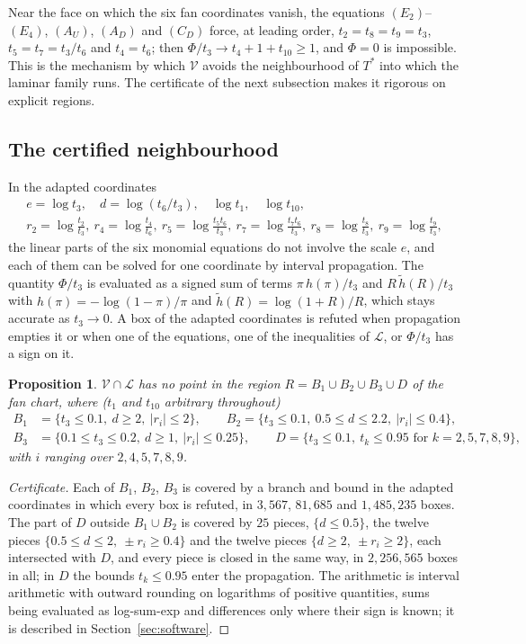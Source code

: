 \documentclass[11pt,a4paper]{article}
\newtheorem{proposition}[theorem]{Proposition}
\theoremstyle{definition}
\theoremstyle{remark}
\newcommand{\V}{\mathcal{V}}
\newcommand{\Lam}{\mathcal{L}}
\newcommand{\Tstar}{T^{*}}
\begin{document}
Near the face on which the six fan coordinates vanish, the equations $(E_2)$--$(E_4)$, $(A_U)$, $(A_D)$
and $(C_D)$ force, at leading order, $t_2 = t_8 = t_9 = t_3$, $t_5 = t_7 = t_3/t_6$ and $t_4 = t_6$; then
$\Phi / t_3 \to t_4 + 1 + t_{10} \ge 1$, and $\Phi = 0$ is impossible. This is the mechanism by which $\V$
avoids the neighbourhood of $\Tstar$ into which the laminar family runs. The certificate of the next
subsection makes it rigorous on explicit regions.

\subsection{The certified neighbourhood}
In the adapted coordinates
\[
\begin{gathered}
e = \log t_3,\quad d = \log(t_6/t_3),\quad \log t_1,\quad \log t_{10},\\
r_2 = \log\frac{t_2}{t_3},\ r_4 = \log\frac{t_4}{t_6},\ r_5 = \log\frac{t_5 t_6}{t_3},\
r_7 = \log\frac{t_7 t_6}{t_3},\ r_8 = \log\frac{t_8}{t_3},\ r_9 = \log\frac{t_9}{t_3},
\end{gathered}
\]
the linear parts of the six monomial equations do not involve the scale $e$, and each of them can be
solved for one coordinate by interval propagation. The quantity $\Phi/t_3$ is evaluated as a signed sum
of terms $\pi\, h(\pi)/t_3$ and $R\,\tilde h(R)/t_3$ with $h(\pi) = -\log(1-\pi)/\pi$ and
$\tilde h(R) = \log(1+R)/R$, which stays accurate as $t_3 \to 0$. A box of the adapted coordinates is
refuted when propagation empties it or when one of the equations, one of the inequalities of $\Lam$, or
$\Phi/t_3$ has a sign on it.

\begin{proposition}\label{prop:RB}
$\V \cap \Lam$ has no point in the region $R = B_1 \cup B_2 \cup B_3 \cup D$ of the fan chart, where
($t_1$ and $t_{10}$ arbitrary throughout)
\begin{align*}
B_1 &= \{t_3 \le 0.1,\ d \ge 2,\ |r_i| \le 2\}, \qquad
B_2 = \{t_3 \le 0.1,\ 0.5 \le d \le 2.2,\ |r_i| \le 0.4\},\\
B_3 &= \{0.1 \le t_3 \le 0.2,\ d \ge 1,\ |r_i| \le 0.25\},\qquad
D = \{t_3 \le 0.1,\ t_k \le 0.95 \text{ for } k = 2, 5, 7, 8, 9\},
\end{align*}
with $i$ ranging over $2, 4, 5, 7, 8, 9$.
\end{proposition}

\begin{proof}[Certificate]
Each of $B_1$, $B_2$, $B_3$ is covered by a branch and bound in the adapted coordinates in which every box
is refuted, in $3{,}567$, $81{,}685$ and $1{,}485{,}235$ boxes. The part of $D$ outside $B_1 \cup B_2$ is
covered by $25$ pieces, $\{d \le 0.5\}$, the twelve pieces $\{0.5 \le d \le 2,\ \pm r_i \ge 0.4\}$ and the
twelve pieces $\{d \ge 2,\ \pm r_i \ge 2\}$, each intersected with $D$, and every piece is closed in the
same way, in $2{,}256{,}565$ boxes in all; in $D$ the bounds
$t_k \le 0.95$ enter the propagation. The arithmetic
is interval arithmetic with outward rounding on logarithms of positive quantities, sums being evaluated as
log-sum-exp and differences only where their sign is known; it is described in
Section~\ref{sec:software}.
\end{proof}
\end{document}
